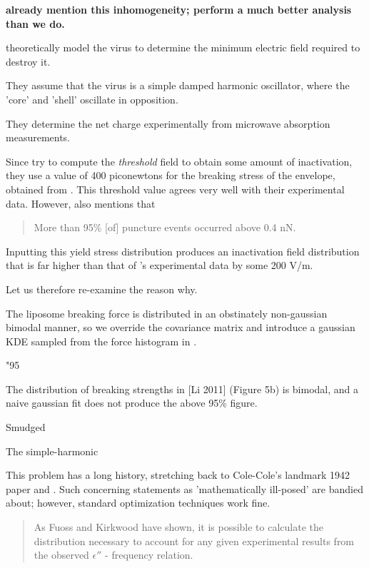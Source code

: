 \documentclass[paper.tex]{subfiles}
\begin{document}
	
\begin{center}
	{\bf \cite{Microwave2009} already mention this inhomogeneity; \cite{Elastic} perform a much better analysis than we do.}
\end{center}
	

\cite{Efficient2015} theoretically model the virus to determine the minimum electric field required to destroy it. 

They assume that the virus is a simple damped harmonic oscillator, where the 'core' and 'shell' oscillate in opposition. 

They determine the net charge experimentally from microwave absorption measurements.



Since \cite{Efficient2015} try to compute the {\it threshold} field to obtain some amount of inactivation, they use a value of 400 piconewtons for the breaking stress of the envelope, obtained from \cite{Bending2011}. This threshold value agrees very well with their experimental data. However, \cite{Bending2011} also mentions that 

\begin{quote}
	More than 95\% [of] puncture events occurred above 0.4 nN.
\end{quote}

Inputting this yield stress distribution produces an inactivation field distribution that is far higher than that of \cite{Efficient2015}'s experimental data by some 200 V/m.

Let us therefore re-examine the reason why.

The liposome breaking force is distributed in an obstinately non-gaussian bimodal manner, so we override the covariance matrix and introduce a gaussian KDE sampled from the force histogram in \cite{Bending2011}.




"95%

The distribution of breaking strengths in [Li 2011] (Figure 5b) is bimodal, and a naive gaussian fit does not produce the above 95\% figure.

Smudged 

The simple-harmonic

This problem has a long history, stretching back to Cole-Cole's landmark 1942\cite{Dispersion1941} paper and \cite{Electrical1941}. Such concerning statements as 'mathematically ill-posed' are bandied about; however, standard optimization techniques work fine.

\begin{quote}
	As Fuoss and Kirkwood have shown, it is possible to calculate the distribution necessary to account for any given experimental results from the observed $\epsilon''$ - frequency relation.
\end{quote}
\end{document}

